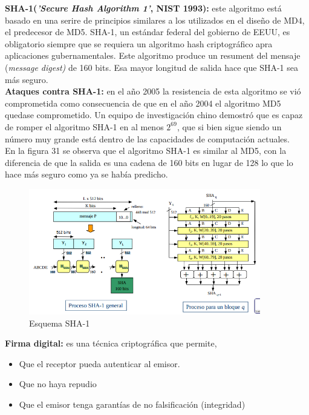 \documentclass[a4paper,11pt]{article}
\begin{document}
\textbf{SHA-1(\textit{'Secure Hash Algorithm 1'}, NIST 1993):} este algoritmo está basado en una serire de principios similares a los utilizados en el diseño de MD4, el predecesor de MD5. SHA-1, un estándar federal del gobierno de EEUU, es obligatorio siempre que se requiera un algoritmo hash criptográfico apra aplicaciones gubernamentales. Este algoritmo produce un resument del mensaje (\textit{message digest)} de 160 bits. Esa mayor longitud de salida hace que SHA-1 sea más seguro. \\

\textbf{Ataques contra SHA-1:} en el año 2005 la resistencia de esta algoritmo se vió comprometida como consecuencia de que en el año 2004 el algoritmo MD5 quedase comprometido. Un equipo de investigación chino demostró que es capaz de romper el algoritmo SHA-1 en al menos $2^69$, que si bien sigue siendo un número muy grande está dentro de las capacidades de computación actuales. \\

En la figura 31 se observa que el algoritmo SHA-1 es similar al MD5, con la diferencia de que la salida es una cadena de 160 bits en lugar de 128 lo que lo hace más seguro como ya se había predicho.

\begin{figure}[h]
\centering
\caption{Esquema SHA-1}
\includegraphics[scale=1, width=0.9\textwidth]{esquema_sha-1.png}
\end{figure}

\textbf{Firma digital:} es una técnica criptográfica que permite,

\begin{itemize}
\item Que el receptor pueda autenticar al emisor.
\item Que no haya repudio
\item Que el emisor tenga garantías de no falsificación (integridad)
\end{itemize}
\end{document}
